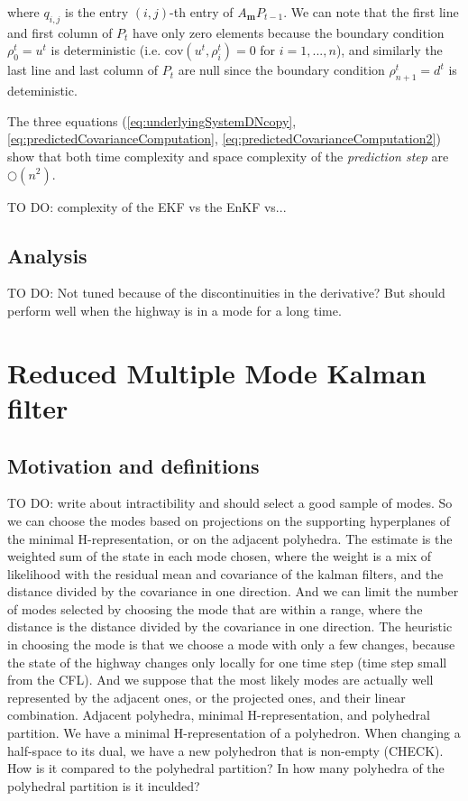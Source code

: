 \documentclass[11pt]{article}
\numberwithin{equation}{section}
\numberwithin{figure}{section}
\numberwithin{table}{section}
\begin{document}
\noindent where $q_{i,j}$ is the entry $(i,j)$-th entry of $A_{\boldsymbol m}P_{t-1}$. We can note that the first line and first column of $P_{t}$ have only zero elements because the boundary condition $\rho^{t}_{0}=u^{t}$ is deterministic (i.e. $\text{cov}(u^{t},\rho^{t}_{i})=0$ for $i=1,...,n$), and similarly the last line and last column of $P_{t}$ are null since the boundary condition $\rho^{t}_{n+1}=d^{t}$ is deteministic.

The three equations (\ref{eq:underlyingSystemDNcopy}, \ref{eq:predictedCovarianceComputation}, \ref{eq:predictedCovarianceComputation2}) show that both time complexity and space complexity of the \textit{prediction step} are $\bigcirc(n^{2})$.

TO DO: complexity of the EKF vs the EnKF vs...

\subsection{Analysis}

TO DO: Not tuned because of the discontinuities in the derivative? But should perform well when the highway is in a mode for a long time.


\section{Reduced Multiple Mode Kalman filter}

\subsection{Motivation and definitions}

TO DO: write about intractibility and should select a good sample of modes. So we can choose the modes based on projections on the supporting hyperplanes of the minimal H-representation, or on the adjacent polyhedra. The estimate is the weighted sum of the state in each mode chosen, where the weight is a mix of likelihood with the residual mean and covariance of the kalman filters, and the distance divided by the covariance in one direction. And we can limit the number of modes selected by choosing the mode that are within a range, where the distance is the distance divided by the covariance in one direction. The heuristic in choosing the mode is that we choose a mode with only a few changes, because the state of the highway changes only locally for one time step (time step small from the CFL). And we suppose that the most likely modes are actually well represented by the adjacent ones, or the projected ones, and their linear combination. Adjacent polyhedra, minimal H-representation, and polyhedral partition. We have a minimal H-representation of a polyhedron. When changing a half-space to its dual, we have a new polyhedron that is non-empty (CHECK). How is it compared to the polyhedral partition? In how many polyhedra of the polyhedral partition is it inculded?
\end{document}
